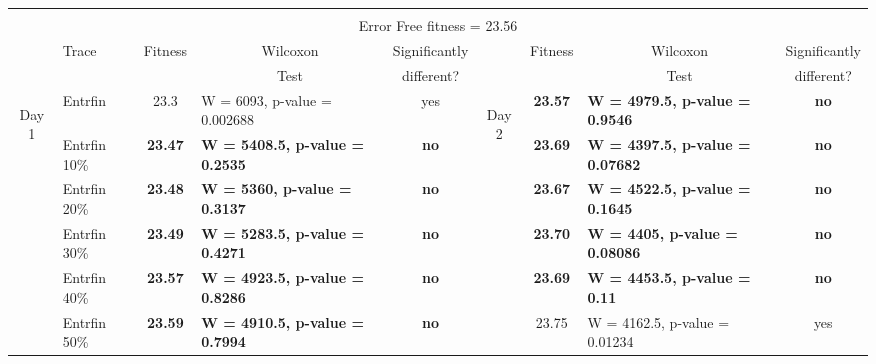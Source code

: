\documentclass[graybox]{sty/svmult}
\begin{document}
\begin{table}
    \begin{tiny}
\begin{center}
    \begin{tabular}{|l| l c l c |c| c l c|}
        \multicolumn{9}{c}{} \\[1ex]
        \multicolumn{9}{c}{Error Free fitness = 23.56} \\
        \hline \hline
        \multicolumn{1}{c}{}& \multirow{2}{*}{Trace} &\multirow{2}{*}{Fitness} & \multicolumn{1}{c}{Wilcoxon} &
        \multicolumn{1}{c}{Significantly} & \multicolumn{1}{c}{}&\multirow{2}{*}{Fitness} &\multicolumn{1}{c}{Wilcoxon}
        &\multicolumn{1}{c}{Significantly} \\
        \multicolumn{1}{c}{}& & & \multicolumn{1}{c}{Test} &\multicolumn{1}{c}{different?} & \multicolumn{1}{c}{}& &
        \multicolumn{1}{c}{Test} & \multicolumn{1}{c}{different?}\\

        \hline
        \multicolumn{1}{|c|}{\multirow{21}{*}{\begin{sideways}Day 1\end{sideways}}} &
            Entrfin &  23.3 & W = 6093, p-value = 0.002688 & yes &
            \multicolumn{1}{|c|}{\multirow{21}{*}{\begin{sideways}Day 2\end{sideways}}} &  \textbf{23.57}       & \textbf{W = 4979.5, p-value = 0.9546}   & \textbf{no} \\
& Entrfin 10\%                &  \textbf{23.47}   & \textbf{W = 5408.5, p-value = 0.2535} & \textbf{no} &  &  \textbf{23.69}  & \textbf{W = 4397.5, p-value = 0.07682}   & \textbf{no} \\
& Entrfin 20\%                &  \textbf{23.48} & \textbf{W = 5360, p-value = 0.3137} & \textbf{no} &  &  \textbf{23.67}      & \textbf{W = 4522.5, p-value = 0.1645}   & \textbf{no} \\
& Entrfin 30\%                &  \textbf{23.49}   & \textbf{W = 5283.5, p-value = 0.4271} & \textbf{no} &  &  \textbf{23.70}  & \textbf{W = 4405, p-value = 0.08086}   & \textbf{no} \\
& Entrfin 40\%                &  \textbf{23.57}   & \textbf{W = 4923.5, p-value = 0.8286} & \textbf{no} & & \textbf{23.69}  & \textbf{W = 4453.5, p-value = 0.11}             & \textbf{no} \\
& Entrfin 50\%                &  \textbf{23.59}   & \textbf{W = 4910.5, p-value = 0.7994} & \textbf{no} & & 23.75 &  W = 4162.5, p-value = 0.01234
& yes \\ [1ex]
 

\end{tabular}
\end{center}
\end{tiny}
\end{table}
\end{document}
